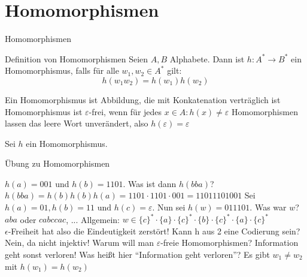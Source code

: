 \documentclass[handout]{beamer}
\begin{document}
\section{Homomorphismen}

\begin{frame}{Homomorphismen}
\begin{block} {Definition von Homomorphismen}\p
Seien $A, B$ Alphabete. \p Dann ist $h: A^* \rightarrow B^*$ \p ein Homomorphismus\p , falls für alle $w_1, w_2 \in A^*$ gilt:\\ \p
\begin{equation*}
h(w_1w_2) = h(w_1)h(w_2)
\end{equation*}
\end{block}

\begin{itemize}
\pitem Ein Homomorphismus ist Abbildung, die mit Konkatenation verträglich ist
\pitem Homomorphismus ist $\varepsilon$-frei, wenn für jedes $x \in A: h(x) \neq \varepsilon$
\pitem Homomorphismen lassen das leere Wort unverändert, also $h(\varepsilon) = \varepsilon$
\end{itemize}
\end{frame}

\begin{frame}
Sei $h$ ein Homomorphismus.

\begin{taskblock}{Übung zu Homomorphismen}
\begin{enumerate}
\pitem $h(a) = 001$ und $h(b) = 1101$. Was ist dann $h(bba)$? 
\pitem[$\rightarrow$] $h(bba) = h(b)h(b)h(a) = 1101 \cdot 1101 \cdot 001 = 11011101001$
\pitem Sei $h(a) = 01, h(b) = 11 \text{ und } h(c) = \varepsilon$. Nun sei $h(w)= 011101$. Was war $w$? 
\pitem[$\rightarrow$] $aba$ oder $cabccac$, ... Allgemein: $w \in \{c\}^* \cdot \{a\} \cdot \{c\}^* \cdot \{b\} \cdot \{c\}^* \cdot \{a\} \cdot \{c\}^*$ \\ \p $\epsilon$-Freiheit hat also die Eindeutigkeit zerstört!
\pitem Kann h aus 2 eine Codierung sein?
\pitem[$\rightarrow$] Nein, da nicht injektiv!
\pitem Warum will man $\varepsilon$-freie Homomorphismen?
\pitem[$\rightarrow$] Information geht sonst verloren!
\pitem Was heißt hier ``Information geht verloren''? 
\pitem[$\rightarrow$] Es gibt $w_1 \neq w_2$ mit $h(w_1) = h(w_2)$
\end{enumerate}
\end{taskblock}
\end{frame}
\end{document}
